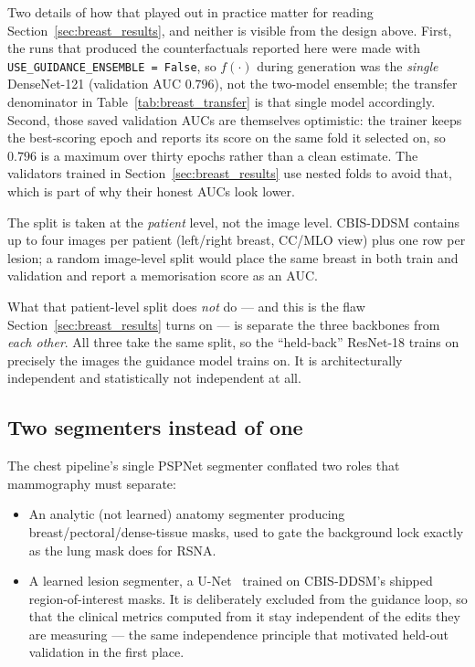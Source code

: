 Two details of how that played out in practice matter for reading
Section~\ref{sec:breast_results}, and neither is visible from the design
above. First, the runs that produced the counterfactuals reported here were
made with \texttt{USE\_GUIDANCE\_ENSEMBLE = False}, so $f(\cdot)$ during
generation was the \emph{single} DenseNet-121 (validation AUC $0.796$), not
the two-model ensemble; the transfer denominator in
Table~\ref{tab:breast_transfer} is that single model accordingly. Second,
those saved validation AUCs are themselves optimistic: the trainer keeps the
best-scoring epoch and reports its score on the same fold it selected on, so
$0.796$ is a maximum over thirty epochs rather than a clean estimate. The
validators trained in Section~\ref{sec:breast_results} use nested folds to
avoid that, which is part of why their honest AUCs look lower.

The split is taken at the \emph{patient} level, not the image level. CBIS-DDSM
contains up to four images per patient (left/right breast, CC/MLO view) plus
one row per lesion; a random image-level split would place the same breast
in both train and validation and report a memorisation score as an AUC.

What that patient-level split does \emph{not} do --- and this is the flaw
Section~\ref{sec:breast_results} turns on --- is separate the three backbones
from \emph{each other}. All three take the same split, so the ``held-back''
ResNet-18 trains on precisely the images the guidance model trains on. It is
architecturally independent and statistically not independent at all.

\subsection{Two segmenters instead of one}

The chest pipeline's single PSPNet segmenter conflated two roles that
mammography must separate:

\begin{itemize}[leftmargin=*]
  \item An analytic (not learned) anatomy segmenter producing
        breast/pectoral/dense-tissue masks, used to gate the background
        lock exactly as the lung mask does for RSNA.
  \item A learned lesion segmenter, a U-Net~\cite{ronneberger2015unet}
        trained on CBIS-DDSM's shipped region-of-interest masks. It is
        deliberately excluded from the guidance loop, so that the
        clinical metrics computed from it stay independent of the edits
        they are measuring --- the same independence principle that
        motivated held-out validation in the first place.
\end{itemize}

